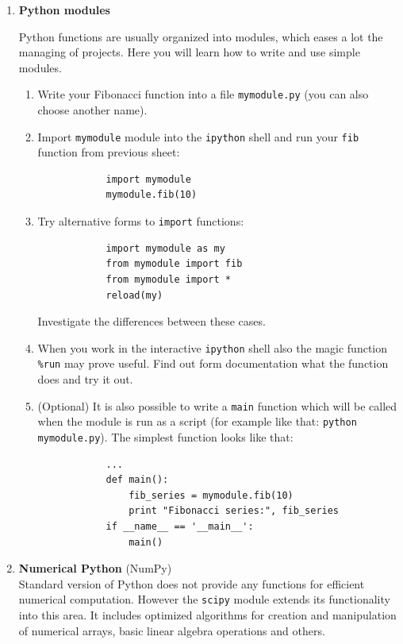 \documentclass[12pt, a4]{article}
\begin{document}
\begin{enumerate}

    \item \textbf{Python modules}

    Python functions are usually organized into modules, which eases a lot the managing of projects. Here you will learn how to write and use simple modules.
    \begin{enumerate}
        \item Write your Fibonacci function into a file \texttt{mymodule.py} (you can also choose another name).
        \item Import \texttt{mymodule} module into the
            \texttt{ipython} shell and run your \texttt{fib} function
            from previous sheet:
        \begin{verbatim}
            import mymodule
            mymodule.fib(10)
        \end{verbatim} 
        \item Try alternative forms to \texttt{import} functions:
        \begin{verbatim}
            import mymodule as my
            from mymodule import fib
            from mymodule import *
            reload(my)
        \end{verbatim}
        Investigate the differences between these cases.
    \item When you work in the interactive \texttt{ipython} shell also
        the magic function \texttt{\%run} may prove useful.
            Find out form documentation what the function does and try
            it out.
        \item (Optional) It is also possible to write a \texttt{main} function which will be called when the module is run as a script (for example like that: \texttt{python mymodule.py}). The simplest function looks like that:
        \begin{verbatim}
            ...
            def main():
                fib_series = mymodule.fib(10)
                print "Fibonacci series:", fib_series
            if __name__ == '__main__':
                main()
        \end{verbatim}
    \end{enumerate}

    \item \textbf{Numerical Python} (NumPy) \\
    Standard version of Python does not provide any functions for
    efficient numerical computation. However the \texttt{scipy} module
    extends its functionality into this area. It includes optimized
    algorithms for creation and manipulation of numerical arrays, basic
    linear algebra operations and others.
    

\end{enumerate}
\end{document}
